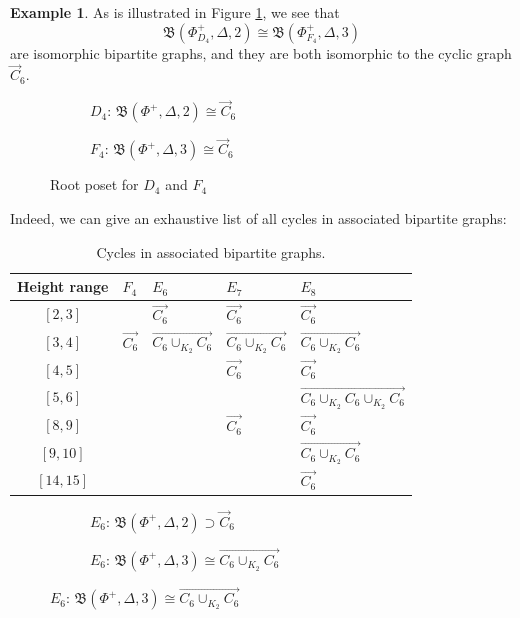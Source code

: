 \documentclass[11pt]{amsart}
\theoremstyle{definition}
\newtheorem{example}[thm]{Example}
\newcommand{\fB}{\mathfrak{B}}
\begin{document}
\begin{example}
As is illustrated in Figure \ref{figure:D4F4},
we see that
\[
\fB(\Phi_{D_4}^+, \Delta, 2)
\cong
\fB(\Phi_{F_4}^+, \Delta, 3)
\]
are isomorphic bipartite graphs,
and they are both isomorphic to the cyclic graph $\vec C_6$.

\begin{figure}[h]
\begin{subfigure}{0.45\textwidth}
\centering
\tikzDfour
\caption{$D_4$: $\fB(\Phi^+, \Delta, 2)\cong \vec C_6$}
\end{subfigure}
\begin{subfigure}{0.45\textwidth}
\centering
\tikzFfour
\caption{$F_4$: $\fB(\Phi^+, \Delta, 3)\cong \vec C_6$}
\end{subfigure}
\caption{Root poset for $D_4$ and $F_4$}
\label{figure:D4F4}
\end{figure}
\end{example}

Indeed, we can give an exhaustive list of all cycles
in associated bipartite graphs:

\begin{table}[H]
\centering
\begin{tabular}{c| l| l| l | l}
\hline
Height range & $F_4$ & $E_6$ & $E_7$ & $E_8$ \\
\hline
$[2,3]$& & $\overrightarrow{C_6}$ & $\overrightarrow{C_6}$ & $\overrightarrow{C_6}$ \\
$[3,4]$& $\overrightarrow{C_6}$ &$\overrightarrow{C_6 \cup_{K_2} C_6}$& $\overrightarrow{C_6 \cup_{K_2} C_6}$ & $\overrightarrow{C_6 \cup_{K_2} C_6}$\\
$[4,5]$& & &$\overrightarrow{C_6}$  &$\overrightarrow{C_6}$ \\
$[5,6]$ && &  & $\overrightarrow{C_6 \cup_{K_2} C_6 \cup_{K_2} C_6}$ \\
$[8,9]$ && &$\overrightarrow{C_6}$ &$\overrightarrow{C_6}$\\
$[9,10]$ && & & $\overrightarrow{C_6 \cup_{K_2} C_6}$\\
$[14,15]$ && & & $\overrightarrow{C_6}$\\
\hline
\end{tabular}
\caption{Cycles in associated bipartite graphs.}
\label{tab:layer-graphs}
\end{table}

\begin{figure}[H]
\begin{subfigure}{0.4\textwidth}
\centering
\tikzESixTwo
\caption{$E_6$: $\fB(\Phi^+, \Delta, 2)\supset \vec C_6$}
\label{figure:E6, layer 2}
\end{subfigure}
\begin{subfigure}{0.4\textwidth}
\tikzESixThree
\caption{$E_6$: $\fB(\Phi^+, \Delta, 3)\cong \overrightarrow{C_6 \cup_{K_2} C_6}$}
\label{figure:E6, layer 3}
\centering
\end{subfigure}
\end{figure}
\end{document}
